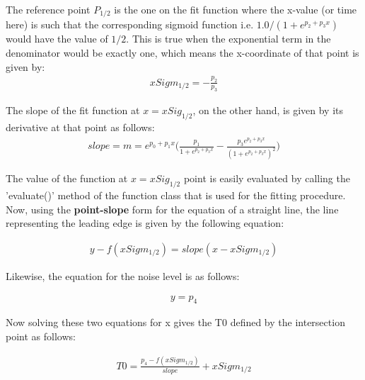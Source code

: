 \documentclass[12pt,epsfig]{article}
\begin{document}
The reference point $P_{1/2}$ is the one on the fit function where the x-value (or time here) is such that the corresponding
sigmoid function i.e. $1.0/(1+e^{p_2 + p_3 x})$ would have the value of $1/2$. This is true when the exponential term in
the denominator would be exactly one, which means the x-coordinate of that point is given by:
\begin{equation}
\label{xSigHalf}
\begin{aligned}
   xSigm_{1/2}   = - \frac{p_2}{p_3}
\end{aligned}
\end{equation}

The slope of the fit function at $x = xSig_{1/2}$, on the other hand, is given by its derivative at that point as
follows:
\begin{equation}
\label{slopeSigHalf}
\begin{aligned}
  slope = m  =  e^{p_0 + p_1 x} \Big( \frac{p_1}{1 + e^{p_2 + p_3 x}} -   \frac{p_3 e^{p_2 + p_3 x}}{(1 + e^{p_2 + p_3 x})^2}    \Big)
\end{aligned}
\end{equation}

The value of the function at $x = xSig_{1/2}$ point is easily evaluated by calling the 'evaluate()' method of the
function class that is used for the fitting procedure. Now, using the \textbf{point-slope} form for the equation of
a straight line, the line representing the leading edge is given by the following equation:

\begin{equation}
\label{eqLeadingEdge}
\begin{aligned}
  y - f(xSigm_{1/2}) = slope (x - xSigm_{1/2})
\end{aligned}
\end{equation}

Likewise, the equation for the noise level is as follows:

\begin{equation}
\label{eqNoiseLevel}
\begin{aligned}
  y = p_4
\end{aligned}
\end{equation}

Now solving these two equations for x gives the T0 defined by the intersection point as follows:

\begin{equation}
\label{T0estm1}
\begin{aligned}
   T0   = \frac{p_4 - f(xSigm_{1/2})}{slope} + xSigm_{1/2}
\end{aligned}
\end{equation}
\end{document}
